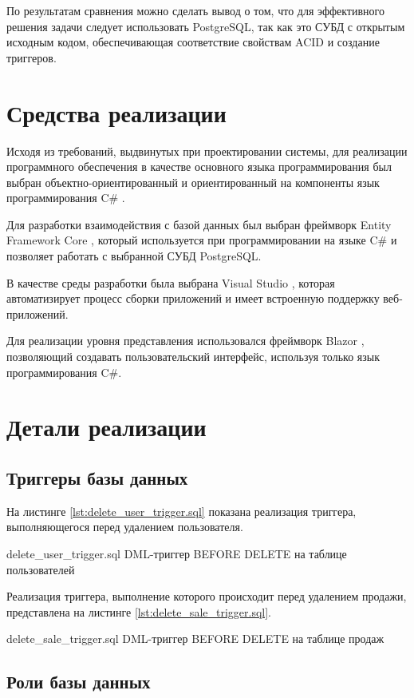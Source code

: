 По результатам сравнения можно сделать вывод о том, что для эффективного решения задачи следует использовать PostgreSQL, так как это СУБД с открытым исходным кодом, обеспечивающая соответствие свойствам ACID и создание триггеров.

\section{Средства реализации}

Исходя из требований, выдвинутых при проектировании системы, для реализации программного обеспечения в качестве основного языка программирования был выбран объектно-ориентированный и ориентированный на компоненты язык программирования C\# \cite{pl}.

Для разработки взаимодействия с базой данных был выбран фреймворк Entity Framework Core \cite{core}, который используется при программировании на языке C\# и позволяет работать с выбранной СУБД PostgreSQL.

В качестве среды разработки была выбрана Visual Studio \cite{vs}, которая автоматизирует процесс сборки приложений и имеет встроенную поддержку веб-приложений.

Для реализации уровня представления использовался фреймворк Blazor \cite{blazor}, позволяющий создавать пользовательский интерфейс, используя только язык программирования C\#.

\section{Детали реализации}

\subsection{Триггеры базы данных}

На листинге \ref{lst:delete_user_trigger.sql} показана реализация триггера, выполняющегося перед удалением пользователя.

    {delete_user_trigger.sql}
    {DML-триггер BEFORE DELETE на таблице пользователей}

Реализация триггера, выполнение которого происходит перед удалением продажи, представлена на листинге \ref{lst:delete_sale_trigger.sql}.   

    {delete_sale_trigger.sql}
    {DML-триггер BEFORE DELETE на таблице продаж}    

\subsection{Роли базы данных}

